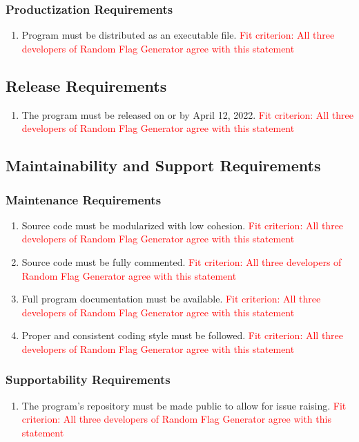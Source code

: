 \documentclass[12pt, titlepage]{article}
\begin{document}
\subsubsection{Productization Requirements}
\begin{enumerate}[label=PE\arabic*., resume=pes]
    \item Program must be distributed as an executable file. \textcolor{red}{Fit criterion: All three developers of Random Flag Generator agree with this statement}
\end{enumerate} 

\subsection{Release Requirements}
\begin{enumerate}[label=RR\arabic*., series=rrs]
    \item The program must be released on or by April 12, 2022. \textcolor{red}{Fit criterion: All three developers of Random Flag Generator agree with this statement}
\end{enumerate} 

\subsection{Maintainability and Support Requirements}

\subsubsection{Maintenance Requirements}
\begin{enumerate}[label=MA\arabic*., series=mas]
    \item Source code must be modularized with low cohesion. \textcolor{red}{Fit criterion: All three developers of Random Flag Generator agree with this statement}
    \item Source code must be fully commented. \textcolor{red}{Fit criterion: All three developers of Random Flag Generator agree with this statement}
    \item Full program documentation must be available. \textcolor{red}{Fit criterion: All three developers of Random Flag Generator agree with this statement}
    \item Proper and consistent coding style must be followed. \textcolor{red}{Fit criterion: All three developers of Random Flag Generator agree with this statement}
\end{enumerate} 
\subsubsection{Supportability Requirements}
\begin{enumerate}[label=MA\arabic*., resume=mas]
    \item The program's repository must be made public to allow for issue raising. \textcolor{red}{Fit criterion: All three developers of Random Flag Generator agree with this statement}
\end{enumerate}
\end{document}
